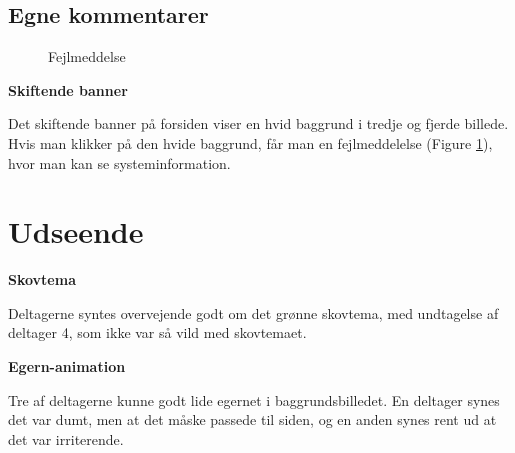 \documentclass[10pt,a4paper]{article}      %
\newcommand\pic[1]{\texttt{[image: Pics/\#1]}}
\renewcommand\good{\pic{good}}
\renewcommand\smallproblem{\pic{smallproblem}}
\renewcommand\seriousproblem{\pic{seriousproblem}}
\begin{document}
\subsection{Egne kommentarer} %
\label{sub:Egne kommentarer forsiden}

\begin{figure}[htbp]
    \centering
    \caption{Fejlmeddelse}
    \label{fig:fejlmeddelelse}
\end{figure}

\begin{kommentarer}
  \item[\seriousproblem]{\textbf{Skiftende banner}}

  Det skiftende banner på forsiden viser en hvid baggrund i tredje og fjerde
  billede. Hvis man klikker på den hvide baggrund, får man en fejlmeddelelse (Figure \ref{fig:fejlmeddelelse}), hvor man kan se systeminformation.
\end{kommentarer}

\section{Udseende}
\begin{kommentarer}
  \item[\good]{\textbf{Skovtema}}
  
  Deltagerne syntes overvejende godt om det grønne skovtema, med
  undtagelse af deltager 4, som ikke var så vild med skovtemaet.

  \item[\smallproblem]{\textbf{Egern-animation}} 
  
  Tre af deltagerne kunne godt lide egernet i baggrundsbilledet. En deltager
  synes det var dumt, men at det måske passede til siden, og en anden synes rent
  ud at det var irriterende.
\end{kommentarer}
\end{document}
